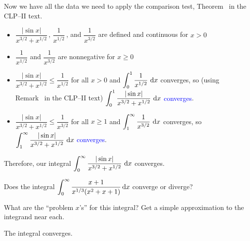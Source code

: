 \begin{solution}
Now we have all the data we need to apply the comparison test, Theorem~ in the CLP--II text.
\begin{itemize}
\item $\dfrac{|\sin x|}{x^{3/2}+x^{1/2}}$\,, $\dfrac{1}{x^{1/2}}$\,, and $\dfrac{1}{x^{3/2}}$ are defined and continuous for $x>0$
\item $\dfrac{1}{x^{1/2}}$ and $\dfrac{1}{x^{3/2}}$ are nonnegative for $x \ge 0$
\item $\dfrac{|\sin x|}{x^{3/2}+x^{1/2}}\le \dfrac{1}{x^{1/2}}$ for all $x > 0$ and
$\displaystyle\int_0^1\dfrac{1}{x^{1/2}}~\mathrm{d}x$ converges, so (using Remark~ in the CLP--II text)\textcolor{blue}{ $\displaystyle\int_0^{1\vphantom{\frac12}}\dfrac{|\sin x|}{x^{3/2}+x^{1/2}}~\mathrm{d}x$ converges}.
\item $\dfrac{|\sin x|}{x^{3/2}+x^{1/2}}\le \dfrac{1}{x^{3/2}}$ for all $x \ge 1$ and
$\displaystyle\int_1^\infty\dfrac{1}{x^{3/2}}~\mathrm{d}x$ converges, so \textcolor{blue}{ $\displaystyle\int_1^{\infty\vphantom{\frac12}}\dfrac{|\sin x|}{x^{3/2}+x^{1/2}}~\mathrm{d}x$ converges}.
\end{itemize}

Therefore, our integral \textcolor{blue}{$\displaystyle\int_0^\infty \frac{|\sin x|}{x^{3/2}+x^{1/2}}~\mathrm{d}x$} {converges}.

\end{solution}


\begin{Mquestion}[M121 2000A]
Does the integral
$\displaystyle\int_0^\infty\frac{x+1}{x^{1/3}(x^2+x+1)}\,\mathrm{d}x$
converge or diverge?
\end{Mquestion}

\begin{hint}
What are the ``problem $x$'s'' for this integral? Get a simple
approximation to the integrand near each.
\end{hint}

\begin{answer}
The integral converges.
\end{answer}

